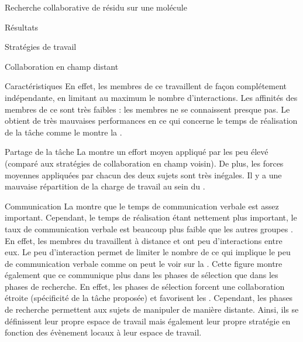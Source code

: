 \documentclass[myfrancais,ngerman,english,frenchb]{mythesis}
\begin{document}
\begin{mychapter}{Recherche collaborative de résidu sur une molécule}
\begin{mysection}{Résultats}
\begin{mysubsection}{Stratégies de travail}
\begin{mysubsubsection}{Collaboration en champ distant}
\begin{myparagraph}{Caractéristiques}
						En effet, les membres de ce  travaillent de façon complétement indépendante, en limitant au maximum le nombre d'interactions.
						Les affinités des membres de ce  sont très faibles  : les membres ne se connaissent presque pas.
						Le  obtient de très mauvaises performances en ce qui concerne le temps de réalisation de la tâche comme le montre la .
					\end{myparagraph}
					\begin{myparagraph}{Partage de la tâche}
						La  montre un effort moyen appliqué par les  peu élevé (comparé aux stratégies de collaboration en champ voisin).
						De plus, les forces moyennes appliquées par chacun des deux sujets sont très inégales.
						Il y a une mauvaise répartition de la charge de travail au sein du .
					\end{myparagraph}
					\begin{myparagraph}{Communication}
						La  montre que le temps de communication verbale est assez important.
						Cependant, le temps de réalisation étant nettement plus important, le taux de communication verbale est beaucoup plus faible que les autres groupes .
						En effet, les membres du  travaillent à distance et ont peu d'interactions entre eux.
						Le peu d'interaction permet de limiter le nombre de  ce qui implique le peu de communication verbale comme on peut le voir sur la .
						Cette figure montre également que ce  communique plus dans les phases de sélection que dans les phases de recherche.
						En effet, les phases de sélection forcent une collaboration étroite (spécificité de la tâche proposée) et favorisent les .
						Cependant, les phases de recherche permettent aux sujets de manipuler de manière distante.
						Ainsi, ils se définissent leur propre espace de travail mais également leur propre stratégie en fonction des évènement locaux à leur espace de travail.

\end{myparagraph}
\end{mysubsubsection}
\end{mysubsection}
\end{mysection}
\end{mychapter}
\end{document}
